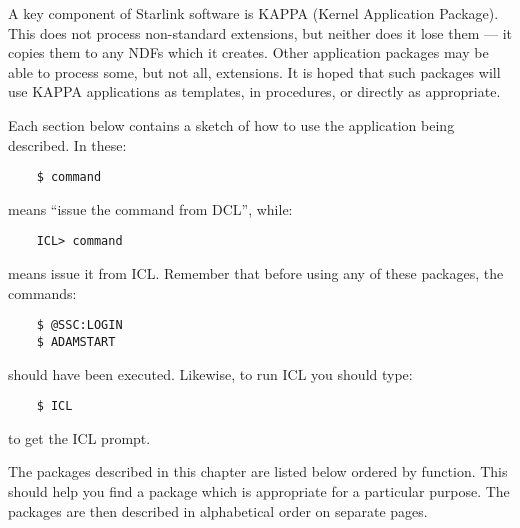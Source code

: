 A key component of Starlink software is KAPPA (Kernel Application Package).
This does not process non-standard extensions, but neither does it lose them
--- it copies them to any NDFs which it creates.
Other application packages may be able to process some, but not all, extensions.
It is hoped that such packages will use KAPPA applications as templates, in
procedures, or directly as appropriate.

Each section below contains a sketch of how to use the application being
described.
In these:

\begin{small}
\begin{verbatim}
    $ command
\end{verbatim}
\end{small}

means ``issue the command from DCL'', while:

\begin{small}
\begin{verbatim}
    ICL> command
\end{verbatim}
\end{small}

means issue it from ICL.
Remember that before using any of these packages, the commands:

\begin{small}
\begin{verbatim}
    $ @SSC:LOGIN
    $ ADAMSTART
\end{verbatim}
\end{small}

should have been executed.
Likewise, to run ICL you should type:

\begin{small}
\begin{verbatim}
    $ ICL
\end{verbatim}
\end{small}

to get the ICL prompt.

The packages described in this chapter are listed below ordered by function.
This should help you find a package which is appropriate for a particular
purpose.
The packages are then described in alphabetical order on separate pages.

\vspace*{5mm}

